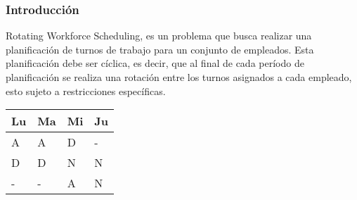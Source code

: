 \frame
{
\frametitle{Introducción}
Rotating Workforce Scheduling, es un problema que busca realizar una planificación de turnos de trabajo para un conjunto 
de empleados. Esta planificación debe ser cíclica, es decir, que al final de cada período de planificación se realiza
una rotación entre los turnos asignados a cada empleado, esto sujeto a restricciones específicas.

\begin{center}
	\begin{tabular}{|l|l|l|l|}
	        \hline
	        Lu & Ma & Mi & Ju \\
	        \hline
	        A & A & D & - \\
	        \hline
	        D & D & N & N \\
	        \hline
	        - & - & A & N \\
	        \hline
	\end{tabular}
\end{center}

}
